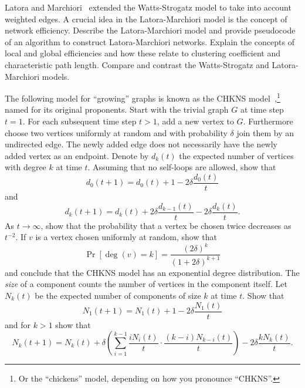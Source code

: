 \begin{problem}
\item Latora and
  Marchiori~\cite{LatoraMarchiori2003} extended
  the Watts-Strogatz model to take into
  account weighted edges. A crucial idea in the
  Latora-Marchiori model is the concept
  of network efficiency. Describe the Latora-Marchiori model and
  provide pseudocode of an algorithm to construct Latora-Marchiori
  networks. Explain the concepts of local and global efficiencies and
  how these relate to clustering coefficient and characteristic path
  length. Compare and contrast the Watts-Strogatz and Latora-Marchiori
  models.

\item The following model for ``growing'' graphs is known as the
  CHKNS model~\cite{CallawayEtAl2001},\footnote{
    Or the ``chickens'' model, depending on how you pronounce
    ``CHKNS''.
  }
  named for its original proponents. Start with the
  trivial graph $G$ at time step $t = 1$. For
  each subsequent time step $t > 1$, add a new vertex to $G$.
  Furthermore choose two vertices uniformly at random and with
  probability $\delta$ join them by an undirected edge. The newly
  added edge does not necessarily have the newly added vertex as an
  endpoint. Denote by $d_k(t)$ the expected number of vertices with
  degree $k$ at time $t$. Assuming that no self-loops are allowed,
  show that
  \[
  d_0(t + 1)
  =
  d_0(t) + 1 - 2\delta \frac{d_0(t)}{t}
  \]
  and
  \[
  d_k(t + 1)
  =
  d_k(t) + 2\delta \frac{d_{k-1}(t)}{t} - 2\delta \frac{d_k(t)}{t}.
  \]
  As $t \to \infty$, show that the probability that a vertex be chosen
  twice decreases as $t^{-2}$. If $v$ is a vertex chosen uniformly at
  random, show that
  \[
  \Pr[\deg(v) = k]
  =
  \frac{(2\delta)^k} {(1 + 2\delta)^{k+1}}
  \]
  and conclude that the CHKNS model has an exponential degree
  distribution. The \emph{size} of a component
  counts the number of vertices in the component itself. Let $N_k(t)$
  be the expected number of components of size $k$ at time $t$. Show
  that
  \[
  N_1(t + 1)
  =
  N_1(t) + 1 - 2\delta \frac{N_1(t)}{t}
  \]
  and for $k > 1$ show that
  \[
  N_k(t + 1)
  =
  N_k(t) + \delta
  \left(
    \sum_{i=1}^{k-1}
    \frac{i N_i(t)}{t} \cdot \frac{(k-i) N_{k-i}(t)}{t}
  \right)
  - 2\delta \frac{k N_k(t)}{t}.
  \]


\end{problem}

